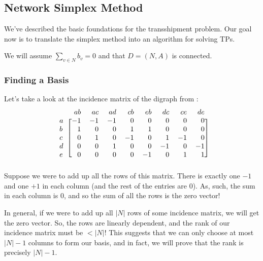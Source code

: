 \subsection{Network Simplex Method}
We've described the basic foundations for the transshipment problem. Our goal now is to translate the simplex method into an algorithm for solving TPs.

\begin{remark}
We will assume $\sum_{v \in N} b_v = 0$ and that $D = (N,A)$ is connected.
\end{remark}

\subsubsection{Finding a Basis}

Let's take a look at the incidence matrix of the digraph from :
\[
  \begin{blockarray}{rrrrrrrrr}
      & ab & ac & ad & cb & eb & dc & ce & de \\
  \begin{block}{l[rrrrrrrr]}
    a & -1 & -1 & -1 &  0 &  0 &  0 &  0 &  0 \\
    b &  1 &  0 &  0 &  1 &  1 &  0 &  0 &  0 \\
    c &  0 &  1 &  0 & -1 &  0 &  1 & -1 &  0 \\
    d &  0 &  0 &  1 &  0 &  0 & -1 &  0 & -1 \\
    e &  0 &  0 &  0 &  0 & -1 &  0 &  1 &  1 \\
  \end{block}
  \end{blockarray}
\]
Suppose we were to add up all the rows of this matrix. There is exactly one $-1$ and one $+1$ in each column (and the rest of the entries are $0$). As, such, the sum in each column is $0$, and so the sum of all the rows is the zero vector!

In general, if we were to add up all $|N|$ rows of some incidence matrix, we will get the zero vector. So, the rows are linearly dependent, and the rank of our incidence matrix must be $< |N|$!
This suggests that we can only choose at most $|N| - 1$ columns to form our basis, and in fact, we will prove that the rank is precisely $|N| - 1$.

